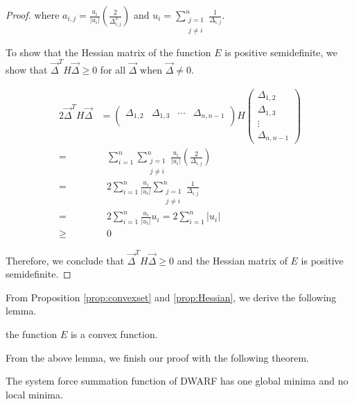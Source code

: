 \begin{proof}
where $a_{i,j} = \frac{u_{i}}{|u_{i}|} \left( \frac{2}{\Delta_{i,j}^3} \right)$ and $u_{i} = \sum_{\substack{j=1\\j \neq i}}^{n}  \frac{1}{\Delta_{i,j}}$.

To show that the Hessian matrix of the function $E$ is positive semidefinite, we show that $\vec{\Delta}^{T}H\vec{\Delta} \geq 0$ for all $\vec{\Delta}$ when $\vec{\Delta} \neq 0$.

\begin{alignat}{2}
\vec{\Delta}^{T}H\vec{\Delta} &=
\begin{pmatrix}
 \Delta_{1,2} & \Delta_{1,3} & \cdots & \Delta_{n,n-1} \\
\end{pmatrix}
H
\begin{pmatrix}
 \Delta_{1,2} \\
 \Delta_{1,3} \\
 \vdots \\
 \Delta_{n,n-1}
\end{pmatrix} \nonumber \\
=& \text{ } \sum_{i = 1}^{n} \sum_{\substack{j=1\\j \neq i}}^{n} \frac{u_{i}}{|u_{i}|}  \left( \frac{2}{\Delta_{i,j}} \right) \nonumber \\
=& \text{ } 2 \sum_{i = 1}^{n} \frac{u_{i}}{|u_{i}|} \sum_{\substack{j=1\\j \neq i}}^{n}  \frac{1}{\Delta_{i,j}} \nonumber \\
=& \text{ } 2 \sum_{i = 1}^{n} \frac{u_{i}}{|u_{i}|} u_{i} = 2 \sum_{i = 1}^{n} |u_{i}| \nonumber \\
\geq& \text{ } 0 \nonumber
\end{alignat}

Therefore, we conclude that $\vec{\Delta}^{T}H\vec{\Delta} \geq 0$ and the Hessian matrix of $E$ is positive semidefinite.  
\end{proof}

From Proposition \ref{prop:convexset} and \ref{prop:Hessian}, we derive the following lemma.
\begin{lem}
the function $E$ is a convex function.
\label{lemma:convexset}
\end{lem}

From the above lemma, we finish our proof with the following theorem.

\begin{thm}
The system force summation function of DWARF has one global minima and no local minima.
\label{theorem:minima}
\end{thm}

